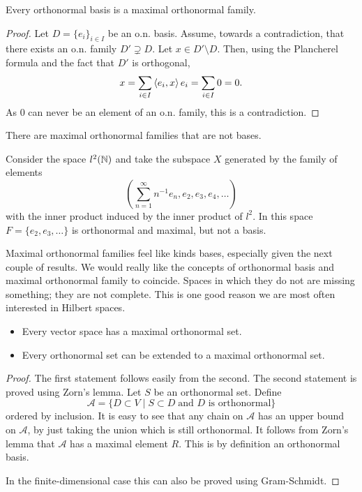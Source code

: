 \begin{lemma}
Every orthonormal basis is a maximal orthonormal family.
\end{lemma}
\begin{proof}
Let $D = \{e_i\}_{i\in I}$ be an o.n. basis. Assume, towards a contradiction, that there exists an o.n. family $D' \supsetneq D$. Let $x\in D'\setminus D$. Then, using the Plancherel formula and the fact that $D'$ is orthogonal,
\[ x = \sum_{i\in I}\left\langle e_{i},x \right\rangle e_{i} = \sum_{i\in I} 0 = 0. \]
As $0$ can never be an element of an o.n. family, this is a contradiction.  
\end{proof}
There are maximal orthonormal families that are not bases.
\begin{example}
Consider the space $l^2(\mathbb{N})$ and take the subspace $X$ generated by the family of elements
\[ \left( \sum_{n=1}^\infty n^{-1}e_n, e_2,e_3,e_4,\ldots \right) \]
with the inner product induced by the inner product of $l^2$. In this space $F=\{e_2,e_3,\ldots\}$ is orthonormal and maximal, but not a basis.
\end{example}

Maximal orthonormal families feel like kinds bases, especially given the next couple of results. We would really like the concepts of orthonormal basis and maximal orthonormal family to coincide. Spaces in which they do not are missing something; they are not complete. This is one good reason we are most often interested in Hilbert spaces.

\begin{theorem}
\begin{itemize}
\item Every vector space has a maximal orthonormal set.
\item Every orthonormal set can be extended to a maximal orthonormal set.
\end{itemize}
\end{theorem}
\begin{proof}
The first statement follows easily from the second. The second statement is proved using Zorn's lemma. Let $S$ be an orthonormal set. Define
\[ \mathcal{A} = \{ D\subset V \;|\; S\subset D \; \text{and $D$ is orthonormal} \} \]
ordered by inclusion. It is easy to see that any chain on $\mathcal{A}$ has an upper bound on $\mathcal{A}$, by just taking the union which is still orthonormal. It follows from Zorn's lemma that $\mathcal{A}$ has a maximal element $R$. This is by definition an orthonormal basis.

In the finite-dimensional case this can also be proved using Gram-Schmidt.
\end{proof}


